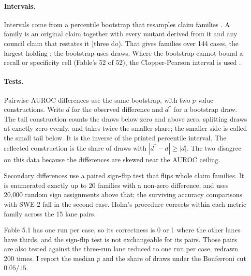 \documentclass[11pt]{article}
\begin{document}
\paragraph{Intervals.} Intervals come from a percentile bootstrap that resamples claim families \citep{efron1993,field2007}. A family is an original claim together with every mutant derived from it and any council claim that restates it (three do). That gives  families over 144 cases, the largest holding ; the bootstrap uses  draws. Where the bootstrap cannot bound a recall or specificity cell (Fable's 52 of 52), the Clopper-Pearson interval is used \citep{clopper1934}.

\paragraph{Tests.} Pairwise AUROC differences use the same bootstrap, with two $p$-value constructions. Write $d$ for the observed difference and $d^\ast$ for a bootstrap draw. The tail construction counts the draws below zero and above zero, splitting draws at exactly zero evenly, and takes twice the smaller share; the smaller side is called the small tail below. It is the inverse of the printed percentile interval. The reflected construction is the share of draws with $|d^\ast - d| \ge |d|$. The two disagree on this data because the differences are skewed near the AUROC ceiling.

Secondary differences use a paired sign-flip test that flips whole claim families. It is enumerated exactly up to 20 families with a non-zero difference, and uses 20,000 random sign assignments above that; the surviving accuracy comparisons with SWE-2 fall in the second case. Holm's procedure \citep{holm1979} corrects within each metric family across the 15 lane pairs.

Fable 5.1 has one run per case, so its correctness is 0 or 1 where the other lanes have thirds, and the sign-flip test is not exchangeable for its pairs. Those pairs are also tested against the three-run lane reduced to one run per case, redrawn 200 times. I report the median $p$ and the share of draws under the Bonferroni cut $0.05/15$.
\end{document}
